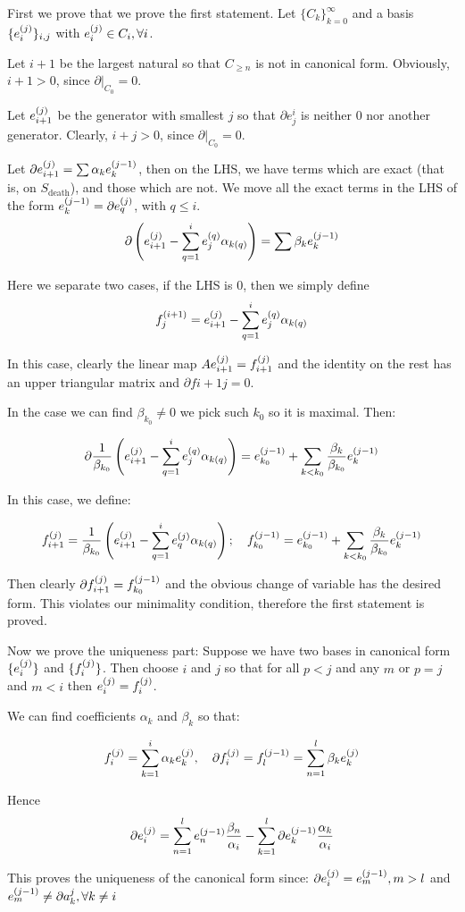 \begin{prof}
First we prove that we prove the first statement. 
Let $\{C_k\}_{k=0}^\infty$ 
and a basis $\{e_{i}^{(j)}\}_{i,j}$ 
with $e_{i}^{(j)}\in C_i,\forall i$.

Let $i+1$ be the largest natural so that $C_{\geq n}$
is not in canonical form. Obviously, $i+1>0$, since $\partial | _{C_0}=0$.

Let $e_{i+1}^{(j)}$ be the generator with smallest $j$ so that $\partial e^i_j$
is neither 0 nor another generator. Clearly, $i+j>0$, since $\partial | _{C_0}=0$.
	
Let $\partial e_{i+1}^{(j)}=\sum \alpha_k e_{k}^{(j-1)}$, then on the LHS, we have terms which are exact (that is, on $S_{\text{death}}$),
and those which are not. We move all the exact terms in the LHS of the form $e_{k}^{(j-1)}=\partial e_{q}^{(j)}$, with $q\leq i$.
$$
\partial\left(
e_{i+1}^{(j)}
-
\sum_{q=1}^i
e_{j}^{(q)}\alpha_{k(q)}
\right)
=
\sum \beta_k e_{k}^{(j-1)}
$$

Here we separate two cases,
if the LHS is $0$, then we simply define 
$$
f_{j}^{(i+1)}=
e_{i+1}^{(j)}
-
\sum_{q=1}^i
e_{j}^{(q)}\alpha_{k(q)}
$$

In this case, clearly the linear map $A e_{i+1}^{(j)}=f_{i+1}^{(j)}$ and the identity on the rest 
has an upper triangular matrix and $\partial f{i+1}{j}=0$.

In the case we can find $\beta_{k_0}\neq 0 $ we pick such $k_0$ so it is maximal. Then:

$$
\partial
\frac{1}{\beta_{k_0}}
\left(
e_{i+1}^{(j)}
-
\sum_{q=1}^i
e_{j}^{(q)}\alpha_{k(q)}
\right)
=
e_{k_0}^{(j-1)}
+
\sum_{k<k_0} \frac{\beta_k}{\beta_{k_0}} e_{k}^{(j-1)}
$$

In this case, we define:

$$
f_{i+1}^{(j)}
=
\frac{1}{\beta_{k_0}}
\left(
e_{i+1}^{(j)}
-
\sum_{q=1}^i
e_{q}^{(j)}\alpha_{k(q)}
\right);
\quad
f_{k_{0}}^{(j-1)}
=
e_{k_0}^{(j-1)}
+
\sum_{k<k_0} \frac{\beta_k}{\beta_{k_0}} e_{k}^{(j-1)}
$$

Then clearly $\partial f_{i+1}^{(j)}=f_{k_0}^{(j-1)}$ and the obvious change of variable has the desired form.
This violates our minimality condition, therefore the first statement is proved.

Now we prove the uniqueness part: Suppose we have two bases in canonical form
$\{e_{i}^{(j)}\}$ and $\{f_{i}^{(j)}\}$. Then choose $i$ and $j$ so that for all $p<j$ and any $m$
or $p=j$ and $m<i$ then $e_{i}^{(j)}=f_{i}^{(j)}$. 

We can find coefficients $\alpha_k$ and $\beta_k$ so that:

$$
f_{i}^{(j)}
=
\sum_{k=1}^i \alpha_k e_{k}^{(j)},
\quad
\partial f_{i}^{(j)} = f_{l}^{(j-1)}
=
\sum_{n=1}^l \beta_k e_{k}^{(j)}
$$

Hence 
$$
\partial e_{i}^{(j)}=
\sum_{n=1}^l
e_{n}^{(j-1)}\frac{\beta_n}{\alpha_i}
-
\sum_{k=1}^l
\partial e_{k}^{(j-1)}\frac{\alpha_k}{\alpha_i}
$$

This proves the uniqueness of the canonical form since: $\partial e_{i}^{(j)}=e_{m}^{(j-1)},m>l$ and 
$e_{m}^{(j-1)}\neq \partial a_k^j, \forall k\neq i$
 
\end{prof}



